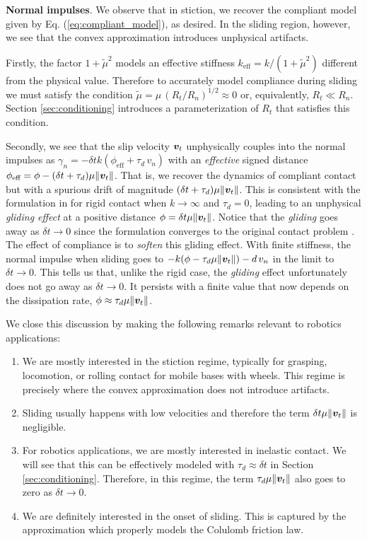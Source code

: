 \textbf{Normal impulses}. We observe that in stiction, we recover the compliant
model given by Eq. (\ref{eq:compliant_model}), as desired. In the sliding
region, however, we see that the convex approximation introduces unphysical
artifacts. 

Firstly, the factor $1+\tilde{\mu}^2$ models an effective stiffness
$k_\text{eff}=k/(1+\tilde{\mu}^2)$ different from the physical value. Therefore
to accurately model compliance during sliding we must satisfy the condition
$\tilde\mu=\mu\,(R_t/R_n)^{1/2} \approx 0$ or, equivalently, $R_t \ll R_n$.
Section \ref{sec:conditioning} introduces a parameterization of $R_t$ that
satisfies this condition.

Secondly, we see that the slip velocity ${\bm{v}}_t$ unphysically couples into the
normal impulses as $\gamma_n=-\delta t k (\phi_\text{eff} + \tau_d\,v_n)$ with
an \textit{effective} signed distance $\phi_\text{eff} = \phi-(\delta
t+\tau_d)\mu\Vert{\bm{v}}_t\Vert$. That is, we recover the dynamics of compliant
contact but with a spurious drift of magnitude $(\delta
t+\tau_d)\mu\Vert{\bm{v}}_t\Vert$. This is consistent with the formulation in
\cite{bib:anitescu2010} for rigid contact when $k\rightarrow \infty$ and
$\tau_d=0$, leading to an unphysical \textit{gliding effect} at a positive
distance $\phi=\delta t\mu\Vert{\bm{v}}_t\Vert$. Notice that the \textit{gliding}
goes away as $\delta t\rightarrow 0$ since the formulation converges to the
original contact problem \cite{bib:anitescu2006}. The effect of compliance is to
\textit{soften} this gliding effect. With finite stiffness, the normal impulse
when sliding goes to $-k(\phi-\tau_d\mu\Vert{\bm{v}}_t\Vert)-d\,v_n$ in the limit
to $\delta t\rightarrow 0$. This tells us that, unlike the rigid case, the
\textit{gliding} effect unfortunately does not go away as $\delta t\rightarrow
0$. It persists with a finite value that now depends on the dissipation rate,
$\phi\approx\tau_d\mu\Vert{\bm{v}}_t\Vert$.

We close this discussion by making the following remarks relevant to robotics
applications:
\begin{enumerate}
	\item We are mostly interested in the stiction regime, typically for
	grasping, locomotion, or rolling contact for mobile bases with wheels. This
	regime is precisely where the convex approximation does not introduce
	artifacts.
	\item Sliding usually happens with low velocities and therefore the term
	$\delta t\mu\Vert{\bm{v}}_t\Vert$ is negligible.
	\item For robotics applications, we are mostly interested in inelastic
	contact. We will see that this can be effectively modeled with
	$\tau_d\approx\delta t$ in Section \ref{sec:conditioning}.
	Therefore, in this regime, the term $\tau_d\mu\Vert{\bm{v}}_t\Vert$ also goes
	to zero as $\delta t\rightarrow 0$.
	\item We are definitely interested in the onset of sliding. This is captured
	by the approximation which properly models the Colulomb friction law.
\end{enumerate}
